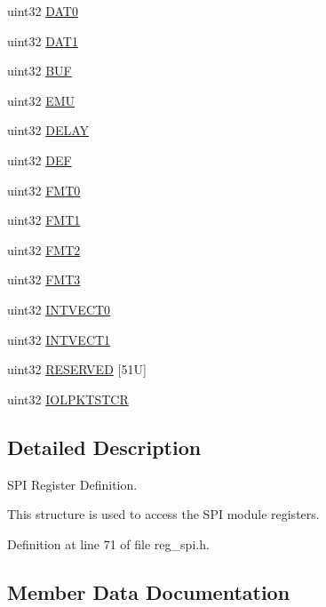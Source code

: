 \begin{DoxyCompactItemize}
uint32 \mbox{\hyperlink{structspiBase_a8d6cc63bd61c04754a926192a900778e}{D\+A\+T0}}
\item 
uint32 \mbox{\hyperlink{structspiBase_a85553fb9cc61392ddf17f76e397c2fe2}{D\+A\+T1}}
\item 
uint32 \mbox{\hyperlink{structspiBase_a8cf3be5abd500e675f629eac2c068c7f}{B\+UF}}
\item 
uint32 \mbox{\hyperlink{structspiBase_a1ac476301511d4a559437c868020d3f1}{E\+MU}}
\item 
uint32 \mbox{\hyperlink{structspiBase_a89ec02b1cb15ce6a68133c7dab13df6d}{D\+E\+L\+AY}}
\item 
uint32 \mbox{\hyperlink{structspiBase_accec72a826230c3a1834d6daaee8443d}{D\+EF}}
\item 
uint32 \mbox{\hyperlink{structspiBase_aad5f415f3f776b9548cc0cb36c6a39b2}{F\+M\+T0}}
\item 
uint32 \mbox{\hyperlink{structspiBase_a4e38b81c53c117468cf5e52b26bdfee1}{F\+M\+T1}}
\item 
uint32 \mbox{\hyperlink{structspiBase_a69bd0438efa7b1dfa000ff049aa3d9ef}{F\+M\+T2}}
\item 
uint32 \mbox{\hyperlink{structspiBase_af6f811146b2b1b201f46bb9f14bf054c}{F\+M\+T3}}
\item 
uint32 \mbox{\hyperlink{structspiBase_a54f67b59e720aa925e5b601b44a04d09}{I\+N\+T\+V\+E\+C\+T0}}
\item 
uint32 \mbox{\hyperlink{structspiBase_a4357e891f573db9392cc760469346051}{I\+N\+T\+V\+E\+C\+T1}}
\item 
uint32 \mbox{\hyperlink{structspiBase_aa7777ad73cf8e1d1508fcdce35c39b3e}{R\+E\+S\+E\+R\+V\+ED}} \mbox{[}51\+U\mbox{]}
\item 
uint32 \mbox{\hyperlink{structspiBase_af5e91e96b84b6911187f466bbfc31951}{I\+O\+L\+P\+K\+T\+S\+T\+CR}}
\end{DoxyCompactItemize}


\subsection{Detailed Description}
S\+PI Register Definition. 

This structure is used to access the S\+PI module registers. 

Definition at line 71 of file reg\+\_\+spi.\+h.



\subsection{Member Data Documentation}
\mbox{\label{structspiBase_a8cf3be5abd500e675f629eac2c068c7f}} 
